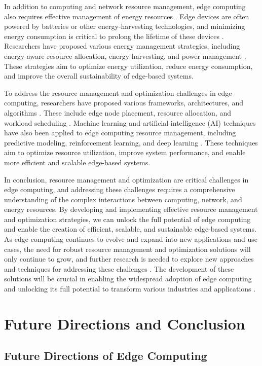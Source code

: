 \documentclass[11pt]{article}
\begin{document}
In addition to computing and network resource management, edge computing also requires effective management of energy resources \cite{ref68}. Edge devices are often powered by batteries or other energy-harvesting technologies, and minimizing energy consumption is critical to prolong the lifetime of these devices \cite{ref69}. Researchers have proposed various energy management strategies, including energy-aware resource allocation, energy harvesting, and power management \cite{ref70}. These strategies aim to optimize energy utilization, reduce energy consumption, and improve the overall sustainability of edge-based systems.

To address the resource management and optimization challenges in edge computing, researchers have proposed various frameworks, architectures, and algorithms \cite{ref71}. These include edge node placement, resource allocation, and workload scheduling \cite{ref72}. Machine learning and artificial intelligence (AI) techniques have also been applied to edge computing resource management, including predictive modeling, reinforcement learning, and deep learning \cite{ref73}. These techniques aim to optimize resource utilization, improve system performance, and enable more efficient and scalable edge-based systems.

In conclusion, resource management and optimization are critical challenges in edge computing, and addressing these challenges requires a comprehensive understanding of the complex interactions between computing, network, and energy resources. By developing and implementing effective resource management and optimization strategies, we can unlock the full potential of edge computing and enable the creation of efficient, scalable, and sustainable edge-based systems. As edge computing continues to evolve and expand into new applications and use cases, the need for robust resource management and optimization solutions will only continue to grow, and further research is needed to explore new approaches and techniques for addressing these challenges \cite{ref74}. The development of these solutions will be crucial in enabling the widespread adoption of edge computing and unlocking its full potential to transform various industries and applications \cite{ref75}.

\section{Future Directions and Conclusion}

\subsection{Future Directions of Edge Computing}
\end{document}
